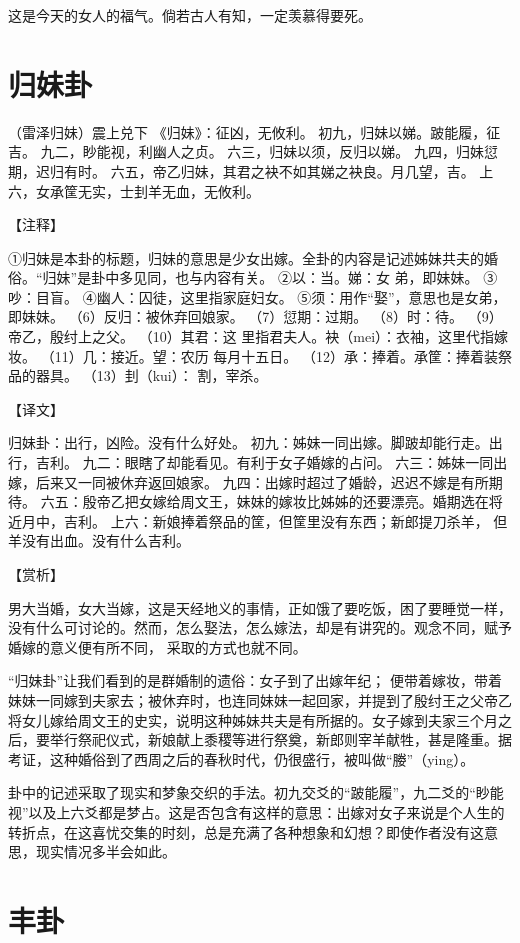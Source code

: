 \documentclass[a4paper,12pt,UTF8,twoside]{ctexbook}
\begin{document}
这是今天的女人的福气。倘若古人有知，一定羡慕得要死。

\chapter{归妹卦}

（雷泽归妹）震上兑下
《归妹》：征凶，无攸利。
初九，归妹以娣。跛能履，征吉。
九二，眇能视，利幽人之贞。
六三，归妹以须，反归以娣。
九四，归妹愆期，迟归有时。
六五，帝乙归妹，其君之袂不如其娣之袂良。月几望，吉。
上六，女承筐无实，士刲羊无血，无攸利。

【注释】

①归妹是本卦的标题，归妹的意思是少女出嫁。全卦的内容是记述姊妹共夫的婚俗。“归妹”是卦中多见同，也与内容有关。
②以：当。娣：女 弟，即妹妹。
③吵：目盲。
④幽人：囚徒，这里指家庭妇女。
⑤须：用作“娶”，意思也是女弟，即妹妹。
（6）反归：被休弃回娘家。
（7）愆期：过期。
（8）时：待。
（9）帝乙，殷纣上之父。
（10）其君：这 里指君夫人。袂（mei）：衣袖，这里代指嫁妆。
（11）几：接近。望：农历 每月十五日。
（12）承：捧着。承筐：捧着装祭品的器具。
（13）刲（kui）： 割，宰杀。

【译文】

归妹卦：出行，凶险。没有什么好处。
初九：姊妹一同出嫁。脚跛却能行走。出行，吉利。
九二：眼瞎了却能看见。有利于女子婚嫁的占问。
六三：姊妹一同出嫁，后来又一同被休弃返回娘家。
九四：出嫁时超过了婚龄，迟迟不嫁是有所期待。
六五：殷帝乙把女嫁给周文王，妹妹的嫁妆比姊姊的还要漂亮。婚期选在将近月中，吉利。
上六：新娘捧着祭品的筐，但筐里没有东西；新郎提刀杀羊， 但羊没有出血。没有什么吉利。

【赏析】

男大当婚，女大当嫁，这是天经地义的事情，正如饿了要吃饭，困了要睡觉一样，没有什么可讨论的。然而，怎么娶法，怎么嫁法，却是有讲究的。观念不同，赋予婚嫁的意义便有所不同， 采取的方式也就不同。

“归妹卦”让我们看到的是群婚制的遗俗：女子到了出嫁年纪； 便带着嫁妆，带着妹妹一同嫁到夫家去；被休弃时，也连同妹妹一起回家，并提到了殷纣王之父帝乙将女儿嫁给周文王的史实，说明这种姊妹共夫是有所据的。女子嫁到夫家三个月之后，要举行祭祀仪式，新娘献上黍稷等进行祭奠，新郎则宰羊献牲，甚是隆重。据考证，这种婚俗到了西周之后的春秋时代，仍很盛行，被叫做“媵”（ying）。

卦中的记述采取了现实和梦象交织的手法。初九交爻的“跛能履”，九二爻的“眇能视”以及上六爻都是梦占。这是否包含有这样的意思：出嫁对女子来说是个人生的转折点，在这喜忧交集的时刻，总是充满了各种想象和幻想？即使作者没有这意思，现实情况多半会如此。

\chapter{丰卦}
\end{document}
